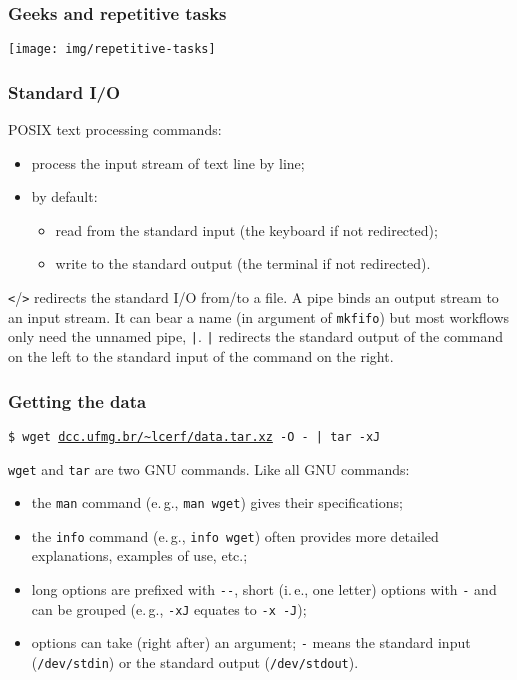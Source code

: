\documentclass{beamer}
\newcommand{\ie}{i.\,e.}
\newcommand{\eg}{e.\,g.}
\begin{document}
\begin{frame}
  \frametitle{Geeks and repetitive tasks}
  \texttt{[image: img/repetitive-tasks]}
\end{frame}

\begin{frame}
  \frametitle{Standard I/O}
  POSIX text processing commands:
  \begin{itemize}
  \item process the input stream of text line by line;
  \item by default:
    \begin{itemize}
    \item read from the standard input (the keyboard if not
      redirected);
    \item write to the standard output (the terminal if not
      redirected).
    \end{itemize}
  \end{itemize}

  \vfill
  \pause

  \texttt{<}/\texttt{>} redirects the standard I/O from/to a file.  A
  pipe binds an output stream to an input stream.  It can bear a name
  (in argument of \texttt{mkfifo}) but most workflows only need the
  unnamed pipe, \texttt{|}.  \texttt{|} redirects the standard output
  of the command on the left to the standard input of the command on
  the right.
\end{frame}

\begin{frame}
  \frametitle{Getting the data}
  \texttt{\$ wget \url{dcc.ufmg.br/~lcerf/data.tar.xz} -O - | tar -xJ}

  \vfill
  \pause

  \texttt{wget} and \texttt{tar} are two GNU commands. Like all GNU
  commands:
  \begin{itemize}[<+->]
  \item the \texttt{man} command (\eg, \texttt{man wget}) gives their
    specifications;
  \item the \texttt{info} command (\eg, \texttt{info wget}) often
    provides more detailed explanations, examples of use, etc.;
  \item long options are prefixed with \texttt{{-}{-}}, short (\ie,
    one letter) options with \texttt{-} and can be grouped (\eg,
    \texttt{-xJ} equates to \texttt{-x -J});
  \item options can take (right after) an argument; \texttt{-} means
    the standard input (\texttt{/dev/stdin}) or the standard output
    (\texttt{/dev/stdout}).
  \end{itemize}
\end{frame}
\end{document}
